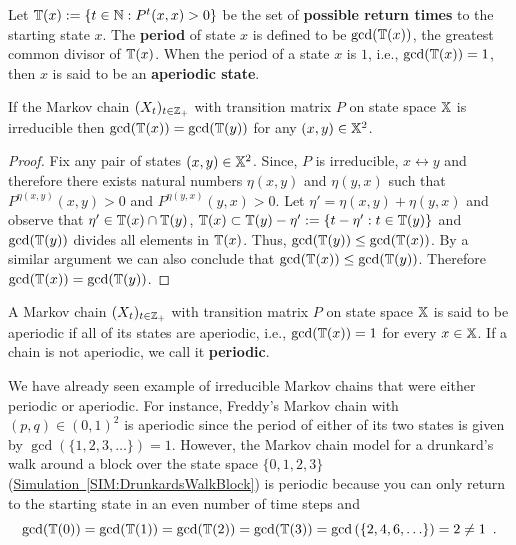 \begin{definition}
Let $\mathbb{T}(x) := \{t \in \mathbb{N} : P^t(x,x)>0\}$ be the set of {\bf possible return times} to the starting state $x$.  The {\bf period} of state $x$ is defined to be $\gcd(\mathbb{T}(x))$, the greatest common divisor of $\mathbb{T}(x)$.  When the period of a state $x$ is $1$, i.e., $\gcd(\mathbb{T}(x))=1$, then $x$ is said to be an {\bf aperiodic state}.
\end{definition}

\begin{prop}
If the Markov chain $(X_t)_{t\in\mathbb{Z}_+}$ with transition matrix $P$ on state space $\mathbb{X}$ is irreducible then $\gcd(\mathbb{T}(x)) = \gcd(\mathbb{T}(y))$ for any $(x,y) \in \mathbb{X}^2$.
\begin{proof}
Fix any pair of states $(x,y) \in \mathbb{X}^2$.  Since, $P$ is irreducible, $x \leftrightarrow y$ and therefore there exists natural numbers $\eta(x,y)$ and $\eta(y,x)$ such that $P^{\eta(x,y)}(x,y)>0$ and $P^{\eta(y,x)}(y,x)>0$.  Let $\eta' = \eta(x,y)+\eta(y,x)$ and observe that $\eta' \in \mathbb{T}(x) \cap \mathbb{T}(y)$, $\mathbb{T}(x) \subset \mathbb{T}(y) - \eta' := \{t-\eta' : t \in \mathbb{T}(y)\}$ and $\gcd(\mathbb{T}(y))$ divides all elements in $\mathbb{T}(x)$.  Thus, $\gcd(\mathbb{T}(y)) \leq \gcd(\mathbb{T}(x))$.  By a similar argument we can also conclude that $\gcd(\mathbb{T}(x)) \leq \gcd(\mathbb{T}(y))$.  Therefore $\gcd(\mathbb{T}(x))=\gcd(\mathbb{T}(y))$.
\end{proof}
\end{prop}

\begin{definition}[Aperiodic]
A Markov chain $(X_t)_{t\in\mathbb{Z}_+}$ with transition matrix $P$ on state space $\mathbb{X}$ is said to be {aperiodic} if all of its states are aperiodic, i.e., $\gcd(\mathbb{T}(x))=1$ for every $x \in \mathbb{X}$.  If a chain is not aperiodic, we call it {\bf periodic}.
\end{definition}

We have already seen example of irreducible Markov chains that  were either periodic or aperiodic.  For instance, Freddy's Markov chain with $(p,q) \in (0,1)^2$ is aperiodic since the period of either of its two states is given by $\gcd(\{1,2,3,\ldots\})=1$.  However, the Markov chain model for a drunkard's walk around a block over the state space $\{0,1,2,3\}$ (\hyperref[SIM:DrunkardsWalkBlock]{Simulation~\ref*{SIM:DrunkardsWalkBlock}}) is periodic because you can only return to the starting state in an even number of time steps and 
$$
\gcd(\mathbb{T}(0))=\gcd(\mathbb{T}(1))=\gcd(\mathbb{T}(2))=\gcd(\mathbb{T}(3))= \gcd \left( \{2,4,6,\ldots\} \right) =2 \neq 1 \enspace .
$$

